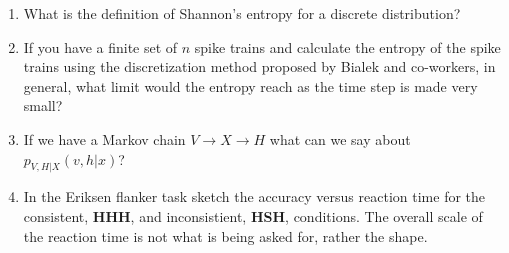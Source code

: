 \documentclass{article}
\newif\ifanswer
\begin{document}
\begin{enumerate}

\item What is the definition of Shannon's entropy for a discrete distribution?

  \ifanswer
  For sample space $\mathcal{X}$ we have
  \begin{equation}
    H(X)=-\sum_{x\in\mathcal{X}}p(x)\log{p(x)}
  \end{equation}
  \fi


\item If you have a finite set of $n$ spike trains and calculate the
  entropy of the spike trains using the discretization method proposed
  by Bialek and co-workers, in general, what limit would the entropy
  reach as the time step is made very small?

  \ifanswer If the time step is small enough each spike train would
  correspond to a different word, with small enough time step, each
  spike in each train would, in general, fall into a different time
  bins. This means there would be $n$ different words, each with one
  occurance and hence probability $1/n$. Thus the entropy would be
  $\log{n}$. I recently had to reject a paper where the authors had
  completely misunderstood this!
  \fi
  
\item If we have a Markov chain $V\rightarrow X\rightarrow H$ what can we say about $p_{V,H|X}(v,h|x)$?

\ifanswer
\begin{equation}
p_{V,H|X}(v,h|x)=p_{V|X}(v|x)p_{H|X}(h|x)
\end{equation}

\item What is the cocktail party problem?

  \ifanswer Often the environment is very noisy with a sound, such as a voice, that is being attended to, not much distinguished in amplitude from other noises. I have read that this situation holds at \lq{}cocktail parties\rq{}, a form of social entertainment. The cocktail party problem is the question of how the brain seperates the sound signal it is attending to from the background noise.
  \fi

\item In the Eriksen flanker task sketch the accuracy versus
reaction time for the consistent, \textbf{HHH}, and inconsistient,
\textbf{HSH}, conditions. The overall scale of the reaction time is
not what is being asked for, rather the shape.


\end{enumerate}
\end{document}
